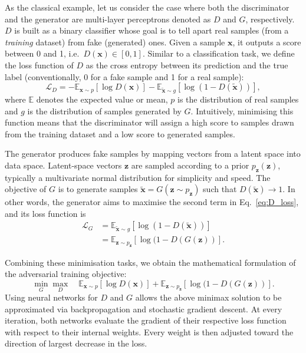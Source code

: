 As the classical example, let us consider the case where both the discriminator and the generator are multi-layer perceptrons denoted as $D$ and $G$, respectively. $D$ is built as a binary classifier whose goal is to tell apart real samples (from a \emph{training} dataset) from fake (generated) ones. Given a sample $\mathbf{x}$, it outputs a score between 0 and 1, i.e.\ $D(\mathbf{x}) \in [0, 1]$. Similar to a classification task, we define the loss function of $D$ as the cross entropy between its prediction and the true label (conventionally, 0 for a fake sample and 1 for a real sample):
\begin{equation}\label{eq:D_loss}
    \mathcal{L}_D = 
    -\mathbb{E}_{\mathbf{x} \sim p} [ \log D(\mathbf{x}) ] -
    \mathbb{E}_{\tilde{\mathbf{x}} \sim g} [ \log( 1 - D(\tilde{\mathbf{x}}) )],
\end{equation}
where $\mathbb{E}$ denotes the expected value or mean, $p$ is the distribution of real samples and $g$ is the distribution of samples generated by $G$.
Intuitively, minimising this function means that the discriminator will assign a high score to samples drawn from the training dataset and a low score to generated samples.


The generator produces fake samples by mapping vectors from a latent space into data space. Latent-space vectors $\mathbf{z}$ are sampled according to a prior $p_\mathbf{z}(\mathbf{z})$, typically a multivariate normal distribution for simplicity and speed. The objective of $G$ is to generate samples $\tilde{\mathbf{x}} = G(\mathbf{z} \sim p_\mathbf{z})$ such that $D(\tilde{\mathbf{x}}) \rightarrow 1$. In other words, the generator aims to maximise the second term in Eq.~\ref{eq:D_loss}, and its loss function is
\begin{align*}
    \mathcal{L}_G &=     
    \mathbb{E}_{\tilde{\mathbf{x}} \sim g} [ \log( 1 - D(\tilde{\mathbf{x}}) )]\\
    &= \mathbb{E}_{\mathbf{z} \sim p_\mathbf{z}} [ \log( 1 - D(G(\mathbf{z}) )].
\end{align*}

Combining these minimisation tasks, we obtain the mathematical formulation of the adversarial training objective:
\begin{equation}\label{eq:GAN}
    \min_G \max_D \quad
    \mathbb{E}_{\mathbf{x} \sim p} [ \log D(\mathbf{x}) ] +
    \mathbb{E}_{\mathbf{z} \sim p_\mathbf{z}} [ \log( 1 - D(G(\mathbf{z}) )].
\end{equation}
Using neural networks for $D$ and $G$ allows the above minimax solution to be approximated via backpropagation and stochastic gradient descent. At every iteration, both networks evaluate the gradient of their respective loss function with respect to their internal weights. Every weight is then adjusted toward the direction of largest decrease in the loss.


